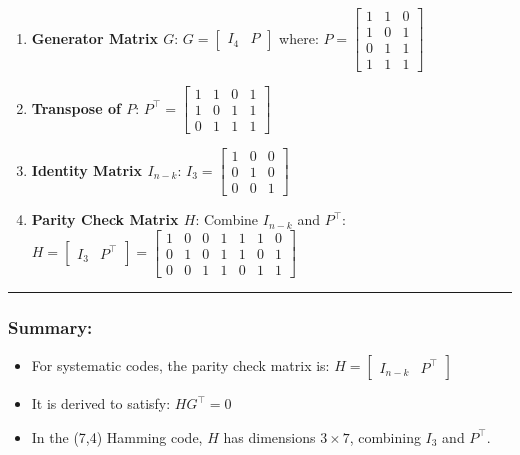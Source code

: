 \documentclass[11pt]{article}
\providecommand{\tightlist}{%
      \setlength{\itemsep}{0pt}\setlength{\parskip}{0pt}}
\begin{document}
\begin{enumerate}
\def\labelenumi{\arabic{enumi}.}
\item
  \textbf{Generator Matrix \(G\)}:
  \(G = \begin{bmatrix} I_4 & P \end{bmatrix}\) where:
  \(P = \begin{bmatrix} 1 & 1 & 0 \\ 1 & 0 & 1 \\ 0 & 1 & 1 \\ 1 & 1 & 1 \end{bmatrix}\)
\item
  \textbf{Transpose of \(P\)}:
  \(P^\top = \begin{bmatrix} 1 & 1 & 0 & 1 \\ 1 & 0 & 1 & 1 \\ 0 & 1 & 1 & 1 \end{bmatrix}\)
\item
  \textbf{Identity Matrix \(I_{n-k}\)}:
  \(I_{3} = \begin{bmatrix} 1 & 0 & 0 \\ 0 & 1 & 0 \\ 0 & 0 & 1 \end{bmatrix}\)
\item
  \textbf{Parity Check Matrix \(H\)}: Combine \(I_{n-k}\) and
  \(P^\top\):
  \(H = \begin{bmatrix} I_{3} & P^\top \end{bmatrix} = \begin{bmatrix} 1 & 0 & 0 & 1 & 1 & 1 & 0 \\ 0 & 1 & 0 & 1 & 1 & 0 & 1 \\ 0 & 0 & 1 & 1 & 0 & 1 & 1 \end{bmatrix}\)
\end{enumerate}

\begin{center}\rule{0.5\linewidth}{0.5pt}\end{center}

\subsubsection{Summary:}\label{summary}

\begin{itemize}
\tightlist
\item
  For systematic codes, the parity check matrix is:
  \(H = \begin{bmatrix} I_{n-k} & P^\top \end{bmatrix}\)
\item
  It is derived to satisfy: \(H G^\top = 0\)
\item
  In the (7,4) Hamming code, \(H\) has dimensions \(3 \times 7\),
  combining \(I_3\) and \(P^\top\).
\end{itemize}
\end{document}
